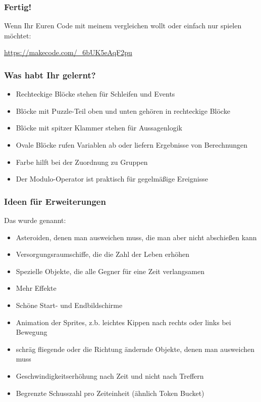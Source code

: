 \documentclass{beamer}
\begin{document}
\begin{frame}
\frametitle{Fertig!}
Wenn Ihr Euren Code mit meinem vergleichen wollt oder einfach nur spielen möchtet:
   
   \href{https://makecode.com/\_6bUK5eAqF2pu}{https://makecode.com/\_6bUK5eAqF2pu}
\end{frame}

 \begin{frame}
\frametitle{Was habt Ihr gelernt?}
\begin{itemize}
\item Rechteckige Blöcke stehen für Schleifen und Events  
\item Blöcke mit Puzzle-Teil oben und unten gehören in rechteckige Blöcke
\item Blöcke mit spitzer Klammer stehen für Aussagenlogik 
\item Ovale Blöcke rufen Variablen ab oder liefern Ergebnisse von Berechnungen
\item Farbe hilft bei der Zuordnung zu Gruppen
\item Der Modulo-Operator ist praktisch für gegelmäßige Ereignisse  
\end{itemize}
\end{frame}
 
 \begin{frame}
\frametitle{Ideen für Erweiterungen}
Das wurde genannt:

\begin{itemize}
\item Asteroiden, denen man ausweichen muss, die man aber nicht abschießen kann
\item Versorgungsraumschiffe, die die Zahl der Leben erhöhen
\item Spezielle Objekte, die alle Gegner für eine Zeit verlangsamen
\item Mehr Effekte
\item Schöne Start- und Endbildschirme
\item Animation der Sprites, z.b. leichtes Kippen nach rechts oder links bei Bewegung
\item schräg fliegende oder die Richtung ändernde Objekte, denen man ausweichen muss
\item Geschwindigkeitserhöhung nach Zeit und nicht nach Treffern
\item Begrenzte Schusszahl pro Zeiteinheit (ähnlich Token Bucket)
\end{itemize}
\end{frame}
 
\end{document}
